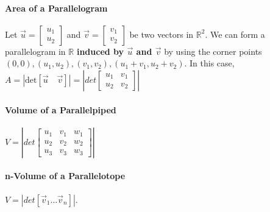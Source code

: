 \documentclass[10pt,letter]{article}
\begin{document}
\paragraph{Area of a Parallelogram} Let $\vec{u}=\begin{bmatrix}u_1\\u_2\end{bmatrix}$ and $\vec{v}=\begin{bmatrix}v_1\\v_2\end{bmatrix}$ be two vectors in $\mathbb{R}^2$. We can form a parallelogram in $\mathbb{R}$ \textbf{induced by $\vec{u}$ and $\vec{v}$} by using the corner points $(0,0),(u_1,u_2),(v_1,v_2),(u_1+v_1,u_2+v_2)$. In this case, $A=|\text{det}[\vec{u}\quad\vec{v}]|=|det\begin{bmatrix}u_1&v_1\\u_2&v_2\end{bmatrix}|$

\paragraph{Volume of a Parallelpiped} $V=\left|det\begin{bmatrix}u_1&v_1&w_1\\u_2&v_2&w_2\\u_3&v_3&w_3\end{bmatrix}\right|$ 

\paragraph{n-Volume of a Parallelotope} $V=|det[\vec{v}_1\ldots\vec{v}_n]|$. 
\end{document}
